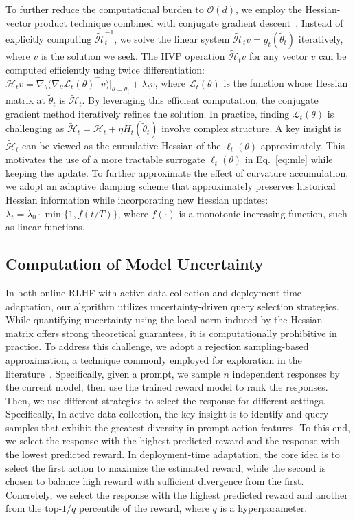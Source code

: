 To further reduce the computational burden to $\mathcal{O}(d)$, we employ the Hessian-vector product technique combined with conjugate gradient descent~\citep{book'04:Boyd-convex}. Instead of explicitly computing $\widetilde{\mathcal{H}}_t^{-1}$, we solve the linear system $\widetilde{\mathcal{H}}_t v = g_t(\widetilde{\theta}_t)$ iteratively, where $v$ is the solution we seek. The HVP operation $\widetilde{\mathcal{H}}_t v$ for any vector $v$ can be computed efficiently using twice differentiation: $\widetilde{\mathcal{H}}_t v = \nabla_\theta \big(\nabla_\theta \mathcal{L}_t(\theta)^\top v\big)\big|_{\theta=\widetilde{\theta}_t} + \lambda_t v$, where $\mathcal{L}_t(\theta)$ is the function whose Hessian matrix at $\widetilde{\theta}_t$ is $\widetilde{\mathcal{H}}_t$. By leveraging this efficient computation, the conjugate gradient method iteratively refines the solution. In practice, finding $\mathcal{L}_t(\theta)$ is challenging as $\widetilde{\mathcal{H}}_t = \mathcal{H}_t + \eta H_t(\widetilde{\theta}_t)$ involve complex structure. A key insight is $\widetilde{\mathcal{H}}_t$ can be viewed as the cumulative Hessian of the $\ell_t(\theta)$ approximately. This motivates the use of a more tractable surrogate $\ell_t(\theta)$ in Eq.~\eqref{eq:mle} while keeping the update. To further approximate the effect of curvature accumulation, we adopt an adaptive damping scheme that approximately preserves historical Hessian information while incorporating new Hessian updates: $\lambda_t = \lambda_0 \cdot \min \{1, f(t / T)\}$, where $f(\cdot)$ is a monotonic increasing function, such as linear functions.


\subsection{Computation of Model Uncertainty}
In both online RLHF with active data collection and deployment-time adaptation, our algorithm utilizes uncertainty-driven query selection strategies. While quantifying uncertainty using the local norm induced by the Hessian matrix offers strong theoretical guarantees, it is computationally prohibitive in practice. To address this challenge, we adopt a rejection sampling-based approximation, a technique commonly employed for exploration in the literature~\citep{arXiv'21:WebGPT,arXiv'23:ReST,TMLR'23:RAFT,TMLR'24:Dong-RLHF}. Specifically, given a prompt, we sample $n$ independent responses by the current model, then use the trained reward model to rank the responses. Then, we use different strategies to select the response for different settings. Specifically, In active data collection, the key insight is to identify and query samples that exhibit the greatest diversity in prompt action features. To this end, we select the response with the highest predicted reward and the response with the lowest predicted reward. In deployment-time adaptation, the core idea is to select the first action to maximize the estimated reward, while the second is chosen to balance high reward with sufficient divergence from the first. Concretely, we select the response with the highest predicted reward and another from the top-$1/q$ percentile of the reward, where $q$ is a hyperparameter.


